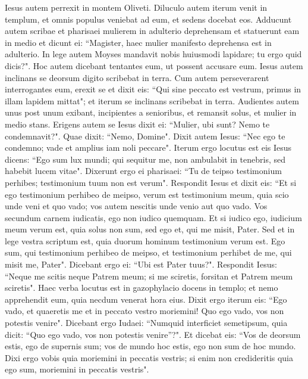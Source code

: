 \begin{biblechapter} 
\verse Iesus autem perrexit in montem Oliveti. 
\verse Diluculo autem iterum venit in templum, et omnis populus veniebat ad eum, et sedens docebat eos. 
\verse Adducunt autem scribae et pharisaei mulierem in adulterio deprehensam et statuerunt eam in medio 
\verse et dicunt ei: “Magister, haec mulier manifesto deprehensa est in adulterio. 
\verse In lege autem Moyses mandavit nobis huiusmodi lapidare; tu ergo quid dicis?". 
\verse Hoc autem dicebant tentantes eum, ut possent accusare eum. Iesus autem inclinans se deorsum digito scribebat in terra. 
\verse Cum autem perseverarent interrogantes eum, erexit se et dixit eis: “Qui sine peccato est vestrum, primus in illam lapidem mittat"; 
\verse et iterum se inclinans scribebat in terra. 
\verse Audientes autem unus post unum exibant, incipientes a senioribus, et remansit solus, et mulier in medio stans. 
\verse Erigens autem se Iesus dixit ei: “Mulier, ubi sunt? Nemo te condemnavit?". 
\verse Quae dixit: “Nemo, Domine". Dixit autem Iesus: “Nec ego te condemno; vade et amplius iam noli peccare". 
\verse Iterum ergo locutus est eis Iesus dicens: “Ego sum lux mundi; qui sequitur me, non ambulabit in tenebris, sed habebit lucem vitae". 
\verse Dixerunt ergo ei pharisaei: “Tu de teipso testimonium perhibes; testimonium tuum non est verum". 
\verse Respondit Iesus et dixit eis: “Et si ego testimonium perhibeo de meipso, verum est testimonium meum, quia scio unde veni et quo vado; vos autem nescitis unde venio aut quo vado. 
\verse Vos secundum carnem iudicatis, ego non iudico quemquam. 
\verse Et si iudico ego, iudicium meum verum est, quia solus non sum, sed ego et, qui me misit, Pater. 
\verse Sed et in lege vestra scriptum est, quia duorum hominum testimonium verum est. 
\verse Ego sum, qui testimonium perhibeo de meipso, et testimonium perhibet de me, qui misit me, Pater". 
\verse Dicebant ergo ei: “Ubi est Pater tuus?". Respondit Iesus: “Neque me scitis neque Patrem meum; si me sciretis, forsitan et Patrem meum sciretis". 
\verse Haec verba locutus est in gazophylacio docens in templo; et nemo apprehendit eum, quia necdum venerat hora eius. 
\verse Dixit ergo iterum eis: “Ego vado, et quaeretis me et in peccato vestro moriemini! Quo ego vado, vos non potestis venire". 
\verse Dicebant ergo Iudaei: “Numquid interficiet semetipsum, quia dicit: “Quo ego vado, vos non potestis venire”?". 
\verse Et dicebat eis: “Vos de deorsum estis, ego de supernis sum; vos de mundo hoc estis, ego non sum de hoc mundo. 
\verse Dixi ergo vobis quia moriemini in peccatis vestris; si enim non credideritis quia ego sum, moriemini in peccatis vestris". 

\end{biblechapter}
